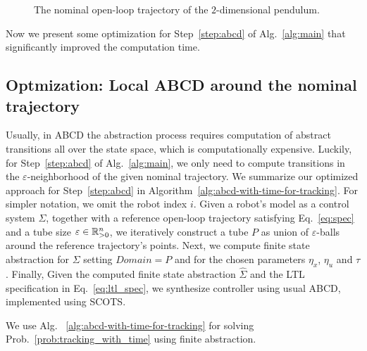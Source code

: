 \begin{remark}
\begin{figure}
			\caption{The nominal open-loop trajectory of the $2$-dimensional pendulum.}
			\label{fig:traj 2d pendulum}
		\end{figure}
\end{remark}

Now we present some optimization for Step~\ref{step:abcd} of Alg.~\ref{alg:main} that significantly improved the computation time.

\subsection{Optmization: Local ABCD around the nominal trajectory}
Usually, in ABCD the abstraction process requires computation of abstract transitions all over the state space, which is computationally expensive.
Luckily, for Step~\ref{step:abcd} of Alg.~\ref{alg:main}, we only need to compute transitions in the $\varepsilon$-neighborhood of the given nominal trajectory.
We summarize our optimized approach for Step~\ref{step:abcd} in Algorithm~\ref{alg:abcd-with-time-for-tracking}.
For simpler notation, we omit the robot index $i$.
Given a robot's model as a control system $\Sigma$, together with a reference open-loop trajectory satisfying Eq.~\eqref{eq:spec} and a tube size $\varepsilon\in \mathbb{R}_{>0}^n$, we iteratively construct a tube $P$ as union of $\varepsilon$-balls around the reference trajectory's points. 
Next, we compute finite state abstraction for $\Sigma$ setting $Domain=P$ and for the chosen parameters $\eta_x$, $\eta_u$ and $\tau$. 
Finally, Given the computed finite state abstraction $\widehat \Sigma$ and the LTL specification in Eq.~\eqref{eq:ltl_spec}, we synthesize controller using usual ABCD, implemented using SCOTS. %

We use Alg.~ \ref{alg:abcd-with-time-for-tracking} for solving Prob.~\ref{prob:tracking_with_time} using finite abstraction.



